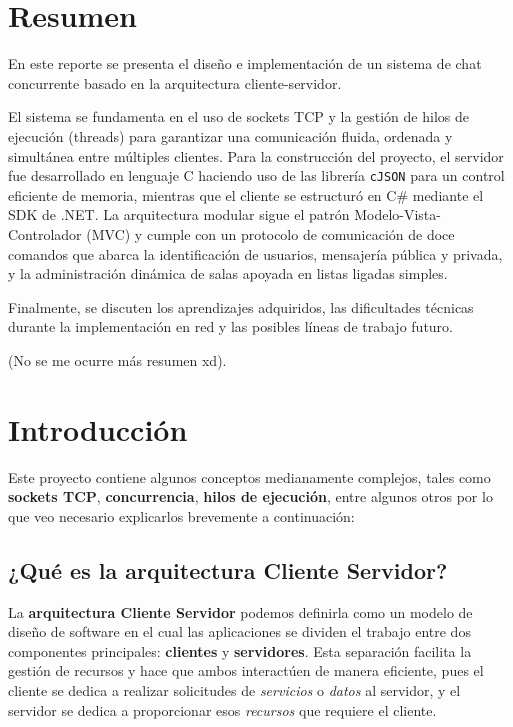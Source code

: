 \documentclass{article}
\begin{document}
\clearpage
{}

\tableofcontents
\clearpage


\section{Resumen}
En este reporte se presenta el diseño e implementación de un sistema de chat concurrente basado en la arquitectura cliente-servidor.

El sistema se fundamenta en el uso de sockets TCP y la gestión de hilos de ejecución (threads) para garantizar una comunicación fluida,
ordenada y simultánea entre múltiples clientes.
Para la construcción del proyecto, el servidor fue desarrollado en lenguaje C haciendo uso
de las librería \texttt{cJSON} para un control eficiente de memoria, mientras que el cliente se estructuró en C\# mediante el SDK de
.NET. La arquitectura modular sigue el patrón Modelo-Vista-Controlador (MVC) y cumple con un protocolo de comunicación de doce comandos que
abarca la identificación de usuarios, mensajería pública y privada, y la administración dinámica de salas apoyada en listas ligadas simples.

Finalmente, se discuten los aprendizajes adquiridos, las dificultades técnicas durante la implementación en red y las posibles líneas de trabajo
futuro.

\vspace{2cm}
(No se me ocurre más resumen xd).

\clearpage

\section{Introducción}
Este proyecto contiene algunos conceptos medianamente complejos, tales como \textbf{sockets TCP}, \textbf{concurrencia}, \textbf{hilos de ejecución},
entre algunos otros por lo que veo necesario explicarlos brevemente a continuación:

\subsection{¿Qué es la arquitectura Cliente Servidor?} \cite{arqui_cliente_servidor}
La \textbf{arquitectura Cliente Servidor} podemos definirla como un modelo de diseño de software en el cual las aplicaciones se dividen el trabajo entre
dos componentes principales: \textbf{clientes} y \textbf{servidores}. Esta separación facilita la gestión de recursos y hace que ambos interactúen de manera
eficiente, pues el cliente se dedica a realizar solicitudes de \textit{servicios} o \textit{datos} al servidor, y el servidor se dedica a proporcionar esos
\textit{recursos} que requiere el cliente.
\end{document}
